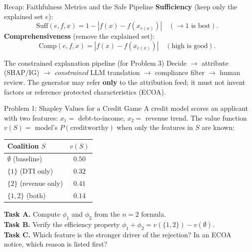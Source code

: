 \documentclass[9pt,t]{beamer}
\begin{document}
\begin{frame}{Recap: Faithfulness Metrics and the Safe Pipeline}
\textbf{Sufficiency} (keep only the explained set $e$):
\[
\text{Suff}(e,f,x) = 1 - |f(x) - f(x_{e(x)})| \quad (\to 1 \text{ is best}).
\]
\textbf{Comprehensiveness} (remove the explained set):
\[
\text{Comp}(e,f,x) = |f(x) - f(x_{\bar{e}(x)})| \quad (\text{high is good}).
\]

\medskip
\begin{block}{The constrained explanation pipeline (for Problem 3)}
Decide $\to$ attribute (SHAP/IG) $\to$ \emph{constrained} LLM translation $\to$
compliance filter $\to$ human review. The generator may refer \textbf{only} to the
attribution feed; it must not invent factors or reference protected
characteristics (ECOA).
\end{block}
\end{frame}

\begin{frame}{Problem 1: Shapley Values for a Credit Game}
A credit model scores an applicant with two features:
$x_1=$ debt-to-income, $x_2=$ revenue trend. The value function $v(S)=$ model's
$P(\text{creditworthy})$ when only the features in $S$ are known:

\medskip
\begin{tabular}{lc}
\toprule
Coalition $S$ & $v(S)$ \\
\midrule
$\emptyset$ (baseline) & $0.50$ \\
$\{1\}$ (DTI only)     & $0.32$ \\
$\{2\}$ (revenue only) & $0.41$ \\
$\{1,2\}$ (both)       & $0.14$ \\
\bottomrule
\end{tabular}

\medskip
\textbf{Task A.} Compute $\phi_1$ and $\phi_2$ from the $n=2$ formula.\\
\textbf{Task B.} Verify the efficiency property $\phi_1+\phi_2 = v(\{1,2\})-v(\emptyset)$.\\
\textbf{Task C.} Which feature is the stronger driver of the rejection? In an
ECOA notice, which reason is listed first?
\end{frame}
\end{document}
